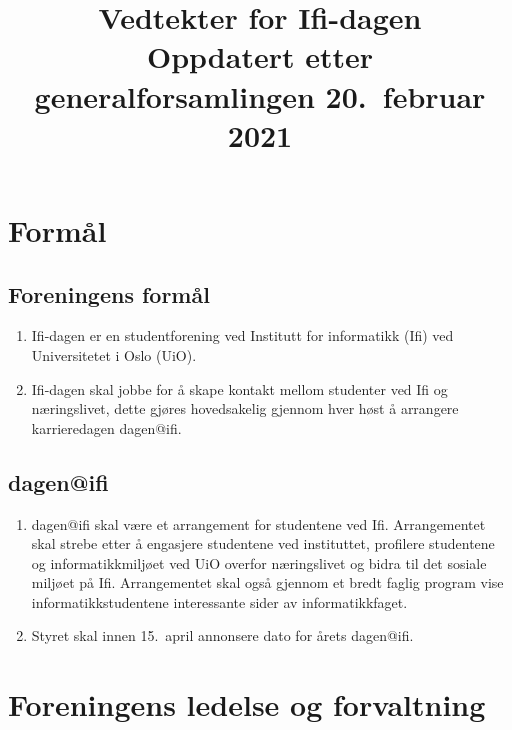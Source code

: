 \documentclass[norsk,a4paper]{article}
\title{\textbf{Vedtekter for Ifi-dagen} \\
{\large Oppdatert etter generalforsamlingen 20.\ februar 2021}}
\date{}
\begin{document}
\maketitle{}
\thispagestyle{fancy}

\section{Formål}
\subsection{Foreningens formål}
\begin{enumerate}
    \item{Ifi-dagen er en studentforening ved Institutt for informatikk (Ifi) ved Universitetet i Oslo (UiO).}
    \item{Ifi-dagen skal jobbe for å skape kontakt mellom studenter ved Ifi og næringslivet, dette gjøres hovedsakelig gjennom hver høst å arrangere karrieredagen dagen@ifi.}
\end{enumerate}
\subsection{dagen@ifi}
\begin{enumerate}
    \item{dagen@ifi skal være et arrangement for studentene ved Ifi. Arrangementet skal strebe etter å engasjere studentene ved instituttet, profilere studentene og informatikkmiljøet ved UiO overfor næringslivet og bidra til det sosiale miljøet på Ifi. Arrangementet skal også gjennom et bredt faglig program vise informatikkstudentene interessante sider av informatikkfaget.}
    \item{Styret skal innen 15.\ april annonsere dato for årets dagen@ifi.}
\end{enumerate}

\section{Foreningens ledelse og forvaltning}
\end{document}

